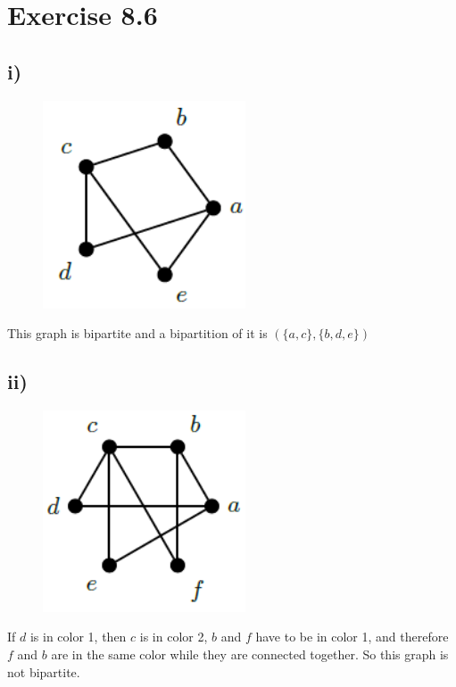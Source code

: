 \documentclass[a4paper,12pt,titlepage]{article}
\begin{document}
\section*{Exercise 8.6}
\subsection*{i)}
\begin{figure}[H]
    \centering
    \includegraphics[width=6cm]{4.png}
\end{figure}
This graph is bipartite and a bipartition of it is $(\lbrace a,c\rbrace,\lbrace b,d,e\rbrace)$

\subsection*{ii)}
\begin{figure}[H]
    \centering
    \includegraphics[width=6cm]{5.png}
\end{figure}
If $d$ is in color 1, then $c$ is in color 2, $b$ and $f$ have to be  in color 1, and therefore $f$ and $b$ are in the same color while they are connected together. So this graph is not bipartite. 
\end{document}
